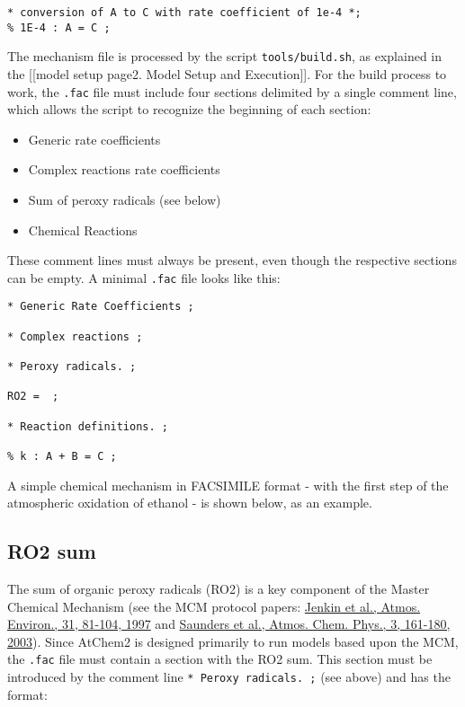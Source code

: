 \begin{verbatim}
* conversion of A to C with rate coefficient of 1e-4 *;
% 1E-4 : A = C ;
\end{verbatim}

The mechanism file is processed by the script \texttt{tools/build.sh},
as explained in the {[}{[}model setup page\textbar{}2. Model Setup and
Execution{]}{]}. For the build process to work, the \texttt{.fac} file
must include four sections delimited by a single comment line, which
allows the script to recognize the beginning of each section:

\begin{itemize}
\item Generic rate coefficients
\item Complex reactions rate coefficients
\item Sum of peroxy radicals (see below)
\item Chemical Reactions
\end{itemize}

These comment lines must always be present, even though the respective
sections can be empty. A minimal \texttt{.fac} file looks like this:

\begin{verbatim}
* Generic Rate Coefficients ;

* Complex reactions ;

* Peroxy radicals. ;

RO2 =  ;

* Reaction definitions. ;

% k : A + B = C ;
\end{verbatim}

A simple chemical mechanism in FACSIMILE format - with the first step
of the atmospheric oxidation of ethanol - is shown below, as an
example.

\subsection{RO2 sum} \label{subsec:ro2-sum}

The sum of organic peroxy radicals (RO2) is a key component of the
Master Chemical Mechanism (see the MCM protocol papers:
\href{https://doi.org/10.1016/S1352-2310(96)00105-7}{Jenkin et al.,
  Atmos. Environ., 31, 81-104, 1997} and
\href{https://doi.org/10.5194/acp-3-161-2003}{Saunders et al., Atmos.
  Chem. Phys., 3, 161-180, 2003}). Since AtChem2 is designed primarily
to run models based upon the MCM, the \texttt{.fac} file must contain
a section with the RO2 sum. This section must be introduced by the
comment line \texttt{*\ Peroxy\ radicals.\ ;} (see above) and has the
format:


